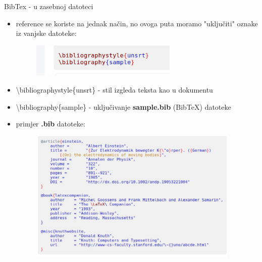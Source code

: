 \documentclass{beamer}
\begin{document}
\begin{frame}{BibTex - u zasebnoj datoteci}
\begin{itemize}
    \item reference se koriste na jednak način, no ovoga puta moramo "uključiti" oznake iz vanjske datoteke: \\
    \begin{figure}
    \includegraphics[width=7cm]{bibtexZaseban.png}
    \end{figure}
    \item \textbackslash bibliographystyle\{unsrt\} - stil izgleda teksta kao u dokumentu \\
    \item \textbackslash bibliography\{sample\} - uključivanje \textbf{sample.bib} (BibTeX) datoteke \\
\end{itemize}    
\end{frame}

\begin{frame}
\begin{itemize}
    \item primjer \textbf{.bib} datoteke:
    \begin{figure}
    \includegraphics[width=10cm]{bibtexZaseban2.png}
    \end{figure}
\end{itemize}    
\end{frame}
\end{document}
